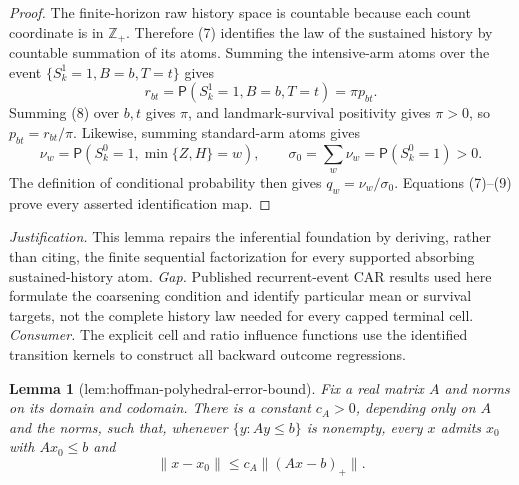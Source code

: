 \documentclass{article}
\newtheorem{lemma}{Lemma}
\begin{document}
\begin{proof}
The finite-horizon raw history space is countable because each count coordinate is in \(\mathbb Z_+\).  Therefore (7) identifies the law of the sustained history by countable summation of its atoms.  Summing the intensive-arm atoms over the event
\(\{S_k^1=1,B=b,T=t\}\) gives
\[
 r_{bt}=\mathsf P(S_k^1=1,B=b,T=t)=\pi p_{bt}.             \tag{8}
\]
Summing (8) over \(b,t\) gives \(\pi\), and landmark-survival positivity gives \(\pi>0\), so \(p_{bt}=r_{bt}/\pi\).  Likewise, summing standard-arm atoms gives
\[
 \nu_w=\mathsf P(S_k^0=1,\min\{Z,H\}=w),\qquad
 \sigma_0=\sum_w\nu_w=\mathsf P(S_k^0=1)>0.              \tag{9}
\]
The definition of conditional probability then gives \(q_w=\nu_w/\sigma_0\).  Equations (7)--(9) prove every asserted identification map.
\end{proof}
\par\smallskip\noindent \textit{Justification.} This lemma repairs the inferential foundation by deriving, rather than citing, the finite sequential factorization for every supported absorbing sustained-history atom. \textit{Gap.} Published recurrent-event CAR results used here formulate the coarsening condition and identify particular mean or survival targets, not the complete history law needed for every capped terminal cell. \textit{Consumer.} The explicit cell and ratio influence functions use the identified transition kernels to construct all backward outcome regressions.

\begin{lemma}[lem:hoffman-polyhedral-error-bound]\label{lem:hoffman-polyhedral-error-bound}
Fix a real matrix \(A\) and norms on its domain and codomain.  There is a constant \(c_A>0\), depending only on \(A\) and the norms, such that, whenever \(\{y:Ay\le b\}\) is nonempty, every \(x\) admits \(x_0\) with \(Ax_0\le b\) and
\[
 \lVert x-x_0\rVert\le c_A\lVert(Ax-b)_+\rVert.
\]
\end{lemma}
\end{document}
